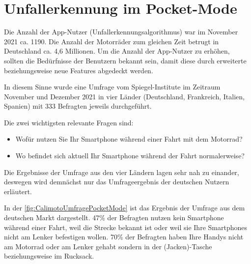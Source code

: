 \chapter{Unfallerkennung im Pocket-Mode}




Die Anzahl der App-Nutzer (Unfallerkennungsalgorithmus) war im November 2021 ca. 1190. Die Anzahl der Motorräder zum gleichen Zeit betrugt in Deutschland ca. 4,6 Millionen. Um die Anzahl der App-Nutzer zu erhöhen, sollten die Bedürfnisse der Benutzern bekannt sein, damit diese durch erweiterte beziehungsweise neue Features abgedeckt werden.

In diesem Sinne wurde eine Umfrage vom Spiegel-Institute im Zeitraum November und Dezember 2021 in vier Länder (Deutschland, Frankreich, Italien, Spanien) mit 333 Befragten jeweils durchgeführt.

Die zwei wichtigsten relevante Fragen sind:
\begin{itemize}
	\item Wofür nutzen Sie Ihr Smartphone während einer Fahrt mit dem Motorrad?
	\item Wo befindet sich aktuell Ihr Smartphone während der Fahrt normalerweise?
\end{itemize}

Die Ergebnisse der Umfrage aus den vier Ländern lagen sehr nah zu einander, deswegen wird demnächst nur das Umfrageergebnis der deutschen Nutzern erläutert.

In der \autoref{fig:CalimotoUmfragePocketMode} ist das Ergebnis der Umfrage aus dem deutschen Markt dargestellt. 47\% der Befragten nutzen kein Smartphone während einer Fahrt, weil die Strecke bekannt ist oder weil sie Ihre Smartphones nicht am Lenker befestigen wollen. 70\% der Befragten haben Ihre Handys nicht am Motorrad oder am Lenker gehabt sondern in der (Jacken)-Tasche beziehungsweise im Rucksack. 



